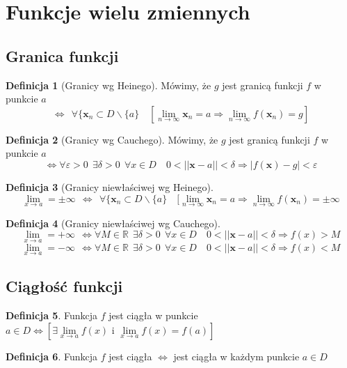\documentclass[12pt,a4paper]{article}
\theoremstyle{definition}
\newtheorem{df}{Definicja}
\begin{document}
\section{Funkcje wielu zmiennych}
\subsection{Granica funkcji}
\begin{df}[Granicy wg Heinego]
Mówimy, że $g$ jest granicą funkcji $f$ w punkcie $a$
$$\Leftrightarrow ~~\forall \{\mathbf{x}_n \subset D \smallsetminus \{a\} \quad [\lim\limits_{n\to\infty}\mathbf{x}_n = a \Rightarrow \lim\limits_{n\to\infty}f(\mathbf{x}_n)=g]$$
\end{df}
\begin{df}[Granicy wg Cauchego]
Mówimy, że $g$ jest granicą funkcji $f$ w punkcie $a$
$$\Leftrightarrow \forall\varepsilon >0 ~~\exists \delta >0 ~~\forall x\in D \quad 0<||\mathbf{x} - a|| <\delta \Rightarrow |f(\mathbf{x})-g| < \varepsilon$$
\end{df}
\begin{df}[Granicy niewłaściwej wg Heinego]
$$\lim\limits_{x\to a} = \pm \infty~~\Leftrightarrow ~~\forall \{\mathbf{x}_n \subset D \smallsetminus \{a\} \quad [\lim\limits_{n\to\infty}\mathbf{x}_n = a \Rightarrow \lim\limits_{n\to\infty}f(\mathbf{x}_n)=\pm\infty$$
\end{df}
\begin{df}[Granicy niewłaściwej wg Cauchego]
$$\lim\limits_{x\to a} = +\infty~~\Leftrightarrow \forall M\in\mathbb{R}~~\exists \delta >0 ~~\forall x\in D \quad 0<||\mathbf{x} - a|| <\delta \Rightarrow f(x) > M$$
$$\lim\limits_{x\to a} = -\infty~~\Leftrightarrow \forall M\in\mathbb{R}~~\exists \delta >0 ~~\forall x\in D \quad 0<||\mathbf{x} - a|| <\delta \Rightarrow f(x) < M$$
\end{df}

\subsection{Ciągłość funkcji}
\begin{df}
Funkcja $f$ jest ciągła w punkcie $a\in D \Leftrightarrow [\exists \lim\limits_{x\to a}f(x) \text{ i } \lim\limits_{x\to a}f(x) = f(a)]$ 
\end{df}
\begin{df}
Funkcja $f$ jest ciągła $\Leftrightarrow$ jest ciągła w każdym punkcie $a\in D$
\end{df}
\end{document}
